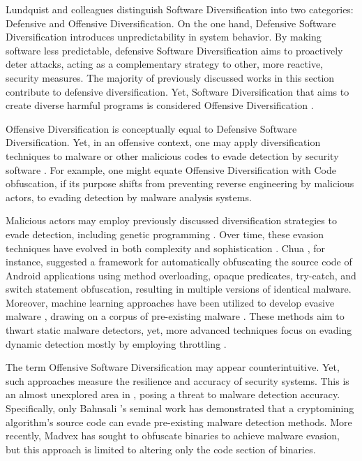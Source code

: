 \label{offensive_definition}

Lundquist and colleagues \cite{offensive_div} distinguish Software Diversification into two categories: Defensive and Offensive Diversification. 
On the one hand, Defensive Software Diversification introduces unpredictability in system behavior. 
By making software less predictable, defensive Software Diversification aims to proactively deter attacks, acting as a complementary strategy to other, more reactive, security measures. 
The majority of previously discussed works in this section contribute to defensive diversification.
Yet, Software Diversification that aims to create diverse harmful programs is considered Offensive Diversification \cite{fred1986computer}.


\begin{strategy}   
    Offensive Diversification is conceptually equal to Defensive Software Diversification.
    Yet, in an offensive context, one may apply diversification techniques to malware or other malicious codes to evade detection by security software \cite{8714698}.
    For example, one might equate Offensive Diversification with Code obfuscation, if its purpose shifts from preventing reverse engineering by malicious actors, to evading detection by malware analysis systems.
    
\end{strategy}


Malicious actors may employ previously discussed diversification strategies to evade detection, including genetic programming \cite{castro2019aimed}.
Over time, these evasion techniques have evolved in both complexity and sophistication \cite{Aghakhani2020WhenMI}.
Chua \etal \cite{chua}, for instance, suggested a framework for automatically obfuscating the source code of Android applications using method overloading, opaque predicates, try-catch, and switch statement obfuscation, resulting in multiple versions of identical malware.
Moreover, machine learning approaches have been utilized to develop evasive malware \cite{2021arXiv211111487D}, drawing on a corpus of pre-existing malware \cite{Bostani2021EvadeDroidAP}.
These methods aim to thwart static malware detectors, yet, more advanced techniques focus on evading dynamic detection mostly by employing throttling \cite{Lu2013WeaknessesID, payer2014embracing}.


The term Offensive Software Diversification may appear counterintuitive.
Yet, such approaches measure the resilience and accuracy of security systems. 
This is an almost unexplored area in \Wasm, posing a threat to malware detection accuracy. 
Specifically, only Bahnsali \etal's seminal work\cite{10.1145/3507657.3528560} has demonstrated that a cryptomining algorithm's source code can evade pre-existing malware detection methods. 
More recently, Madvex \cite{madvex} has sought to obfuscate \Wasm binaries to achieve malware evasion, but this approach is limited to altering only the code section of \Wasm binaries.



